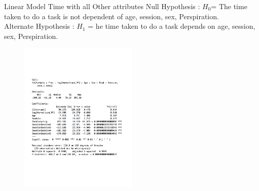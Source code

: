 \documentclass{beamer}
\begin{document}
\begin{frame}{Linear Model}{ Time with all Other attributes}
Null Hypothesis : $H_0 $=  The time taken to do a task is not dependent of age, session, sex, Perspiration.\\
Alternate Hypothesis : $H_1$ =  he time taken to do a task depends on  age, session, sex, Perspiration.
\begin{figure}
	\centering
	\includegraphics[width=0.5\textwidth]{TimeSummary.pdf}
	\centering
\end{figure}
 \end{frame}
\end{document}
